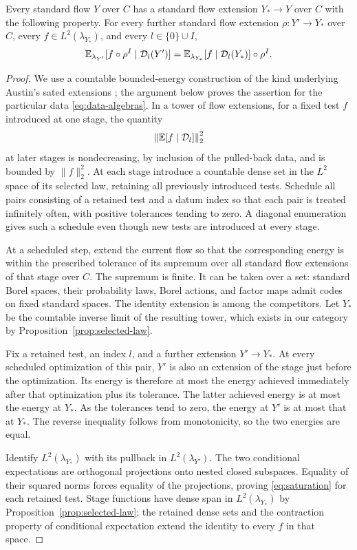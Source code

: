 \begin{lemma}
\label{lem:saturation}
Every standard flow $Y$ over $C$ has a standard flow extension $Y_*\to Y$
over $C$ with the following property. For every further standard flow
extension $\rho:Y'\to Y_*$ over $C$, every $f\in L^2(\lambda_{Y_*})$,
and every $l\in\{0\}\cup I$,
\begin{equation}
 \mathbb E_{\lambda_{Y'}}[f\circ\rho^I\mid\mathcal D_l(Y')]
 =\mathbb E_{\lambda_{Y_*}}[f\mid\mathcal D_l(Y_*)]\circ\rho^I.
 \label{eq:saturation}
\end{equation}
\end{lemma}

\begin{proof}
We use a countable bounded-energy construction of the kind underlying
Austin's sated extensions \cite[Theorem~3.11]{Austin2015}; the argument
below proves the assertion for the particular data
\eqref{eq:data-algebras}. In a tower of flow extensions,
for a fixed test $f$ introduced at one stage, the quantity
\[
  \left\|\mathbb E[f\mid\mathcal D_l]\right\|_2^2
\]
at later stages is nondecreasing, by inclusion of the pulled-back
data, and is bounded by $\|f\|_2^2$. At each stage introduce a countable
dense set in the $L^2$ space of its selected law, retaining all
previously introduced tests. Schedule all pairs consisting of a retained
test and a datum index so that each pair is treated infinitely often,
with positive tolerances tending to zero. A diagonal enumeration gives
such a schedule even though new tests are introduced at every stage.

At a scheduled step, extend the current flow so that the corresponding
energy is within the prescribed tolerance of its supremum over all
standard flow extensions of that stage over $C$. The supremum is
finite. It can be taken over a set: standard Borel spaces, their
probability laws, Borel actions, and factor maps admit codes on fixed
standard spaces. The identity extension is among the competitors.
Let $Y_*$ be the countable inverse limit of the resulting tower,
which exists in our category by Proposition~\ref{prop:selected-law}.

Fix a retained test, an index $l$, and a further extension $Y'\to Y_*$.
At every scheduled optimization of this pair, $Y'$ is also an extension
of the stage just before the optimization. Its energy is therefore at
most the energy achieved immediately after that optimization plus its
tolerance. The latter achieved energy is at most the energy at $Y_*$.
As the tolerances tend to zero, the energy at $Y'$ is at most that at
$Y_*$. The reverse inequality follows from monotonicity, so the two
energies are equal.

Identify $L^2(\lambda_{Y_*})$ with its pullback in
$L^2(\lambda_{Y'})$. The two conditional expectations are orthogonal
projections onto nested closed subspaces. Equality of their squared
norms forces equality of the projections, proving
\eqref{eq:saturation} for each retained test. Stage functions have
dense span in $L^2(\lambda_{Y_*})$ by
Proposition~\ref{prop:selected-law}; the retained dense sets and the
contraction property of conditional expectation extend the identity
to every $f$ in that space.
\end{proof}

